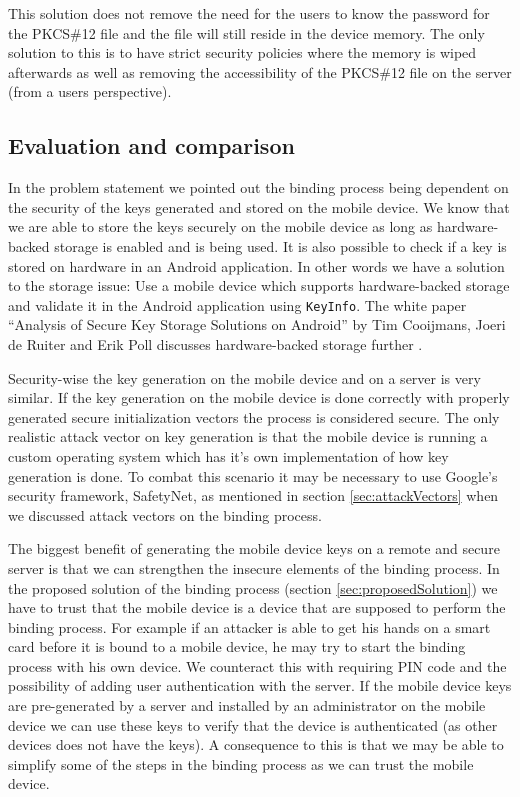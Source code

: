 This solution does not remove the need for the users to know the password for the PKCS\#12 file and the file will still reside in the device memory. The only solution to this is to have strict security policies where the memory is wiped afterwards as well as removing the accessibility of the PKCS\#12 file on the server (from a users perspective).

\subsection{Evaluation and comparison}
In the problem statement we pointed out the binding process being dependent on the security of the keys generated and stored on the mobile device. We know that we are able to store the keys securely on the mobile device as long as hardware-backed storage is enabled and is being used. It is also possible to check if a key is stored on hardware in an Android application. In other words we have a solution to the storage issue: Use a mobile device which supports hardware-backed storage and validate it in the Android application using \texttt{KeyInfo}. The white paper ``Analysis of Secure Key Storage Solutions on Android'' by Tim Cooijmans, Joeri de Ruiter and Erik Poll discusses hardware-backed storage further \cite{KeyStorage}.

Security-wise the key generation on the mobile device and on a server is very similar. If the key generation on the mobile device is done correctly with properly generated secure initialization vectors the process is considered secure. The only realistic attack vector on key generation is that the mobile device is running a custom operating system which has it's own implementation of how key generation is done. To combat this scenario it may be necessary to use Google's security framework, SafetyNet, as mentioned in section \ref{sec:attackVectors} when we discussed attack vectors on the binding process.

The biggest benefit of generating the mobile device keys on a remote and secure server is that we can strengthen the insecure elements of the binding process. In the proposed solution of the binding process (section \ref{sec:proposedSolution}) we have to trust that the mobile device is a device that are supposed to perform the binding process. For example if an attacker is able to get his hands on a smart card before it is bound to a mobile device, he may try to start the binding process with his own device. We counteract this with requiring PIN code and the possibility of adding user authentication with the server. If the mobile device keys are pre-generated by a server and installed by an administrator on the mobile device we can use these keys to verify that the device is authenticated (as other devices does not have the keys). A consequence to this is that we may be able to simplify some of the steps in the binding process as we can trust the mobile device.

